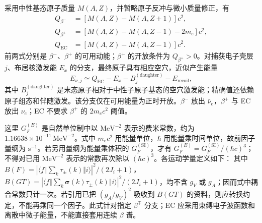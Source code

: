 采用中性基态原子质量 $M(A,Z)$，并暂略原子反冲与微小质量修正，有
\begin{align}
Q_{\beta^-}&=[M(A,Z)-M(A,Z+1)]c^2,\label{eq:4-7-Q-betaminus}\\
Q_{\beta^+}&=[M(A,Z)-M(A,Z-1)-2m_e]c^2,\label{eq:4-7-Q-betaplus}\\
Q_{\mathrm{EC}}&=[M(A,Z)-M(A,Z-1)]c^2.\label{eq:4-7-Q-EC}
\end{align}
前两式分别是 $\beta^-$、$\beta^+$ 的可用动能；$\beta^+$ 的开放条件为 $Q_{\beta^+}>0$。对捕获电子壳层 $j$、布居核激发能 $E_x$ 的分支，最终原子具有相应空穴，近似产生能量
\begin{equation}
E_{\nu,j}\simeq Q_{\mathrm{EC}}-E_x-B_j^{(\mathrm{daughter})}-E_{\mathrm{recoil}},
\end{equation}
其中 $B_j^{(\mathrm{daughter})}$ 是末态原子相对于中性子原子基态的空穴激发能；精确值还依赖原子组态和伴随激发。该分支仅在可用能量为正时开放。$\beta^-$ 放出 $\bar\nu_e$，$\beta^+$ 与 EC 放出 $\nu_e$；EC 不要求 $\beta^+$ 的 $2m_ec^2$ 阈值。

这里 $G_F^{(E)}$ 是自然单位制中以 $\mathrm{MeV}^{-2}$ 表示的费米常数，约为 $1.16638\times10^{-11}\,\mathrm{MeV}^{-2}$。式中 $m_ec^2$ 用能量单位，$\hbar$ 用能量乘时间单位，故前因子量纲为 $\mathrm{s}^{-1}$。若另用量纲为能量乘体积的 $G_F^{(\mathrm{SI})}$，才有 $G_F^{(E)}=G_F^{(\mathrm{SI})}/(\hbar c)^3$；不得对已用 $\mathrm{MeV}^{-2}$ 表示的常数再次除以 $(\hbar c)^3$。各运动学量定义如下：
其中 $B(F)=|\langle f\Vert\sum_k\tau_\pm(k)\Vert i\rangle|^2/(2J_i+1)$，$B(GT)=|\langle f\Vert\sum_k\boldsymbol\sigma(k)\tau_\pm(k)\Vert i\rangle|^2/(2J_i+1)$，均不含 $g_V$ 或 $g_A$；因而式中耦合常数只计一次。若引用已把 $(g_A/g_V)^2$ 吸收到 $B(GT)$ 的资料，则应转换约定，不能再乘同一个因子。此式针对指定 $\beta^\mp$ 分支；EC 应采用束缚电子波函数和离散中微子能量，不能直接套用连续 $\beta$ 谱。

